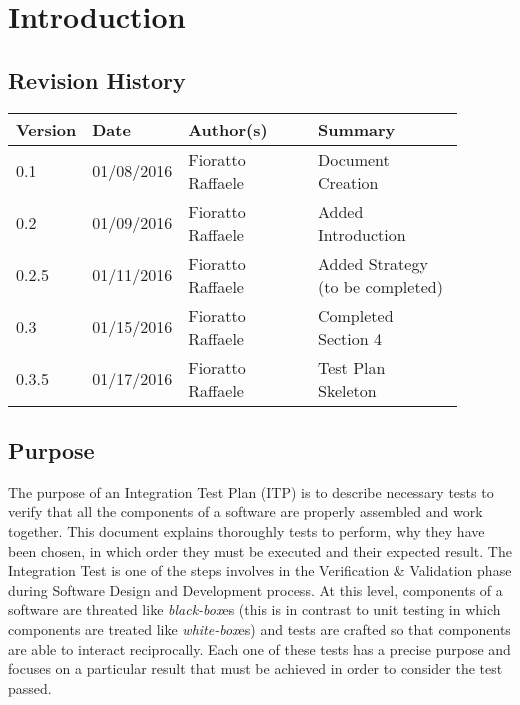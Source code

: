 \newpage
\section{Introduction}
\subsection{Revision History}
\begin{table}[H]
	\centering
	\begin{tabular*}{\linewidth}{|p{0.1\linewidth}|p{0.13\linewidth}|p{0.3099\linewidth}|p{0.3499\linewidth}|}
		\hline
		\textbf{Version} & \textbf{Date}       & \textbf{Author(s)}         & \textbf{Summary}           \\ \hline
		0.1     & 01/08/2016 & Fioratto Raffaele & Document Creation \\ \hline
		0.2		& 01/09/2016 & Fioratto Raffaele & Added Introduction \\ \hline
		0.2.5	& 01/11/2016 & Fioratto Raffaele & Added Strategy (to be completed) \\ \hline 
		0.3		& 01/15/2016 & Fioratto Raffaele & Completed Section 4 \\ \hline
		0.3.5	& 01/17/2016 & Fioratto Raffaele & Test Plan Skeleton \\ \hline
	\end{tabular*}
\end{table}
\break
\subsection{Purpose}
The purpose of an Integration Test Plan (ITP) is to describe necessary tests to verify that all the components of a software are properly assembled and work together. This document explains thoroughly tests to perform, why they have been chosen, in which order they must be executed and their expected result. The Integration Test is one of the steps involves in the Verification \& Validation phase during Software Design and Development process. At this level, components of a software are threated like \textit{black-box}es (this is in contrast to unit testing in which components are treated like \textit{white-box}es) and tests are crafted so that components are able to interact reciprocally. Each one of these tests has a precise purpose and focuses on a particular result that must be achieved in order to consider the test passed.
